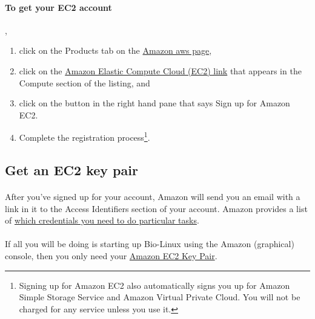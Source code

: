 \paragraph{To get your EC2 account}, 
\begin{enumerate}
\item click on the Products tab on the \href{http://aws.amazon.com}{Amazon aws page},
\item click on the \href{http://aws.amazon.com/ec2/}{Amazon Elastic Compute Cloud (EC2) link} that appears in the Compute section of the listing, and
\item click on the button in the right hand pane that says Sign up for Amazon EC2.  
\item Complete the registration process\footnote{Signing up for Amazon EC2 also automatically signs you up for Amazon Simple Storage Service and Amazon Virtual Private Cloud. You will not be charged for any service unless you use it.}.
\end{enumerate}

\subsection{Get an EC2 key pair}

\paragraph{}After you've signed up for your account, Amazon will send you an email with a link in it to the Access Identifiers section of your account. Amazon provides a list of \href{http://docs.amazonwebservices.com/AWSSecurityCredentials/1.0/AboutAWSCredentials.html#EC2Credentials}{which credentials you need to do particular tasks}. 

\paragraph{}If all you will be doing is starting up Bio-Linux using the Amazon (graphical) console, then you only need your \href{http://docs.amazonwebservices.com/AWSSecurityCredentials/1.0/AboutAWSCredentials.html#EC2KeyPairs}{Amazon EC2 Key Pair}. 

